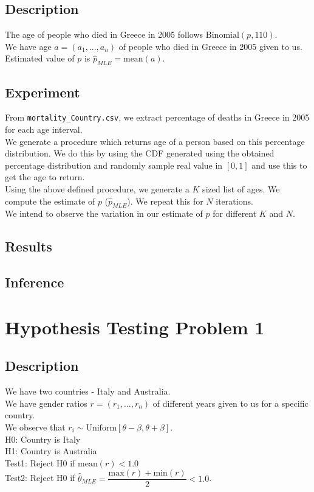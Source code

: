 \documentclass[fleqn, 11pt]{article}
\begin{document}
\subsection{Description}
The age of people who died in Greece in 2005 follows $\mathrm{Binomial}(p, 110)$. \\
We have age $a = (a_1, ..., a_n)$ of people who died in Greece in 2005 given to us. \\
Estimated value of $p$ is $\hat{p}_{MLE} = \mathrm{mean}(a)$.

\subsection{Experiment}
From \verb!mortality_Country.csv!, we extract percentage of deaths in Greece in 2005 for each age interval. \\
We generate a procedure which returns age of a person based on this percentage distribution. We do this by using the CDF generated using the obtained percentage distribution and randomly sample real value in $[0, 1]$ and use this to get the age to return. \\
Using the above defined procedure, we generate a $K$ sized list of ages. We compute the estimate of $p$ ($\hat{p}_{MLE}$). We repeat this for $N$ iterations. \\
We intend to observe the variation in our estimate of $p$ for different $K$ and $N$.

\subsection{Results}


\subsection{Inference}


\newpage
\section{Hypothesis Testing Problem 1}
\subsection{Description}
We have two countries - Italy and Australia. \\
We have gender ratios $r = (r_1, ..., r_n)$ of different years given to us for a specific country. \\
We observe that $r_i \sim \mathrm{Uniform}[\theta-\beta, \theta+\beta]$. \\
H0: Country is Italy \\
H1: Country is Australia \\
Test1: Reject H0 if $\mathrm{mean}(r) < 1.0$ \\
Test2: Reject H0 if $\hat{\theta}_{MLE} = \dfrac{\mathrm{max}(r) + \mathrm{min}(r)}{2} < 1.0$.
\end{document}
